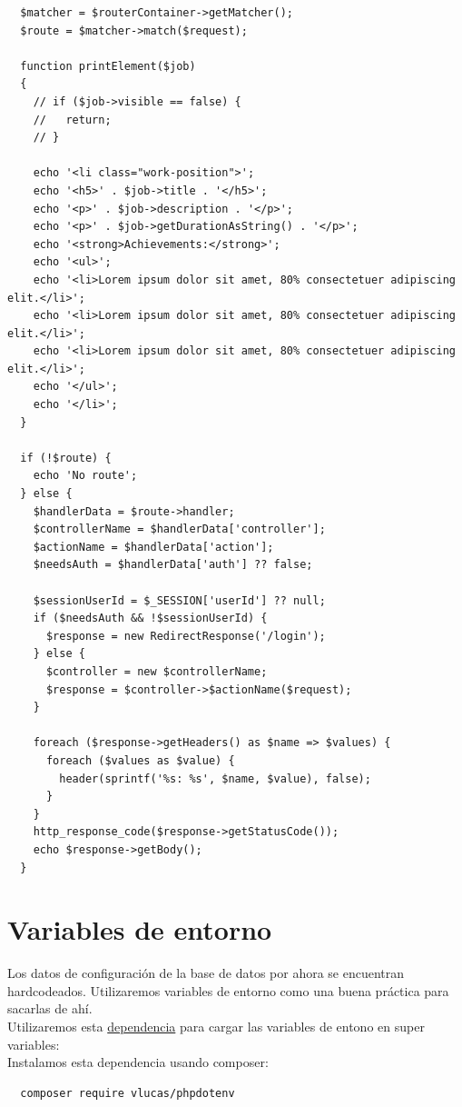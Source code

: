 \documentclass{article}
\begin{document}
\begin{verbatim}
  $matcher = $routerContainer->getMatcher();
  $route = $matcher->match($request);

  function printElement($job)
  {
    // if ($job->visible == false) {
    //   return;
    // }

    echo '<li class="work-position">';
    echo '<h5>' . $job->title . '</h5>';
    echo '<p>' . $job->description . '</p>';
    echo '<p>' . $job->getDurationAsString() . '</p>';
    echo '<strong>Achievements:</strong>';
    echo '<ul>';
    echo '<li>Lorem ipsum dolor sit amet, 80% consectetuer adipiscing elit.</li>';
    echo '<li>Lorem ipsum dolor sit amet, 80% consectetuer adipiscing elit.</li>';
    echo '<li>Lorem ipsum dolor sit amet, 80% consectetuer adipiscing elit.</li>';
    echo '</ul>';
    echo '</li>';
  }

  if (!$route) {
    echo 'No route';
  } else {
    $handlerData = $route->handler;
    $controllerName = $handlerData['controller'];
    $actionName = $handlerData['action'];
    $needsAuth = $handlerData['auth'] ?? false;

    $sessionUserId = $_SESSION['userId'] ?? null;
    if ($needsAuth && !$sessionUserId) {
      $response = new RedirectResponse('/login');
    } else {
      $controller = new $controllerName;
      $response = $controller->$actionName($request);
    }

    foreach ($response->getHeaders() as $name => $values) {
      foreach ($values as $value) {
        header(sprintf('%s: %s', $name, $value), false);
      }
    }
    http_response_code($response->getStatusCode());
    echo $response->getBody();
  }
\end{verbatim}


\newpage
\section{Variables de entorno}%
Los datos de configuración de la base de datos por ahora se encuentran
hardcodeados. Utilizaremos variables de entorno como una buena práctica para
sacarlas de ahí.\\

Utilizaremos esta
\href{https://packagist.org/packages/vlucas/phpdotenv}{dependencia} para cargar
las variables de entono en super variables:\\

Instalamos esta dependencia usando composer:
\begin{verbatim}
  composer require vlucas/phpdotenv
\end{verbatim}
\end{document}
